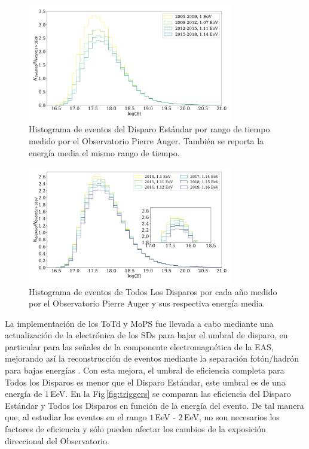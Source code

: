 \begin{figure}[H]
	\centering
	\includegraphics[width=0.8\textwidth]{histograma_Standard.pdf}
	\caption{Histograma de eventos  del Disparo Estándar por rango de tiempo medido por el Observatorio Pierre Auger. También se reporta la energía media el mismo rango de tiempo.}
	\label{fig:futuro}
\end{figure}


\begin{figure}[H]
	\centering
	\includegraphics[width=0.8\textwidth]{histograma_AllTriggers_v2.pdf}
  \caption{Histograma de eventos de  Todos Los Disparos por cada año medido por el Observatorio Pierre Auger y sus respectiva energía media. }
	\label{fig:TLD}
\end{figure}

La implementación de los ToTd y MoPS fue llevada a cabo mediante una actualización de la electrónica de los SDs para bajar el umbral de disparo, en particular para las señales de la componente electromagnética de la EAS, mejorando así la reconstrucción de eventos mediante la separación fotón/hadrón para bajas energías  \cite{pierre2013plans}. Con esta mejora, el umbral de eficiencia completa para Todos los Disparos es menor que el Disparo Estándar, este umbral es de una energía de $1\,$EeV. En la Fig\,\ref{fig:triggers} se comparan las eficiencia del Disparo Estándar y Todos los Disparos en función de la energía del evento. De tal manera que, al estudiar los eventos en el rango $1\,$EeV - $2\,$EeV,  no son necesarios los factores de eficiencia y sólo pueden afectar los cambios de la exposición direccional del Observatorio.


